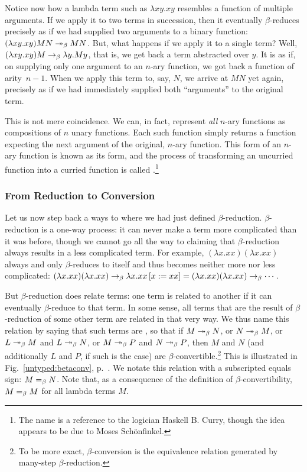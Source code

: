 Notice now how a lambda term such as $\lambda xy. xy$ resembles a function of multiple arguments. If we apply it to two terms in succession, then it eventually $\beta$-reduces precisely as if we had supplied two arguments to a binary function: $(\lambda xy. xy) M N \betared[*] M N$. But, what happens if we apply it to a single term? Well, $(\lambda xy. xy) M \betared \lambda y. My$, that is, we get back a term abstracted over $y$. It is as if, on supplying only one argument to an $n$-ary function, we got back a function of \mbox{arity $n - 1$.} When we apply this term to, say, $N$, we arrive at $M N$ yet again, precisely as if we had immediately supplied both ``arguments'' to the original term.

This is not mere coincidence. We can, in fact, represent \emph{all} $n$-ary functions as compositions of $n$ unary functions. Each such function simply returns a function expecting the next argument of the original, $n$-ary function. This form of an $n$-ary function is known as its  form, and the process of transforming an uncurried function into a curried function is called .\footnote{The name is a reference to the logician Haskell B. Curry, though the idea appears to be due to Moses Sch\"{o}nfinkel.}

\subsubsection{From Reduction to Conversion}\label{untyped:conversion}
Let us now step back a ways to where we had just defined $\beta$-re\-duc\-tion. $\beta$-re\-duc\-tion is a one-way process: it can never make a term more complicated than it was before, though we cannot go all the way to claiming that $\beta$-re\-duc\-tion always results in a less complicated term. For example, $(\lambda x.xx) (\lambda x.xx)$ always and only $\beta$-reduces to itself and thus becomes neither more nor less complicated: $(\lambda x.xx) (\lambda x.xx) \betared \replace{x}{xx}{\lambda x. xx} = (\lambda x.xx) (\lambda x.xx) \betared \dotsb$.

But $\beta$-re\-duc\-tion does relate terms: one term is related to another if it can eventually $\beta$-reduce to that term. In some sense, all terms that are the result of $\beta$-re\-duc\-tion of some other term are related in that very way. We thus name this relation by saying that such terms are , so that if $M \betared[*] N$, or $N \betared[*] M$, or $L \betared[*] M$ and $L \betared[*] N$, or $M \betared[*] P$ and $N \betared[*] P$, then $M$ and $N$ (and additionally $L$ and $P$, if such is the case) are $\beta$-con\-vert\-i\-ble.\footnote{To be more exact, $\beta$-con\-ver\-sion is the equivalence relation generated by many-step $\beta$-re\-duc\-tion.} This is illustrated in Fig.~\ref{untyped:betaconv}, p.~\pageref{untyped:betaconv}. We notate this relation with a subscripted equals sign: $M =_{\beta} N$. Note that, as a consequence of the definition of $\beta$-convertibility, $M =_{\beta} M$ for all lambda terms $M$. 

